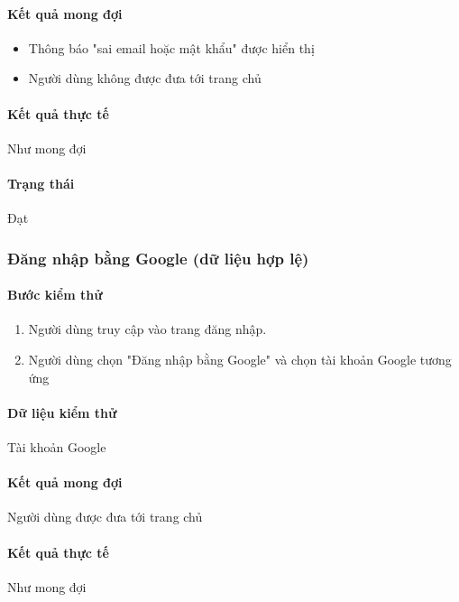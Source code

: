\documentclass[./../main.tex]{subfiles}
\begin{document}
\paragraph*{Kết quả mong đợi}

\begin{itemize}
    \item Thông báo "sai email hoặc mật khẩu" được hiển thị
    \item Người dùng không được đưa tới trang chủ
\end{itemize}

\paragraph*{Kết quả thực tế} Như mong đợi

\paragraph*{Trạng thái} Đạt

\subsubsection{Đăng nhập bằng Google (dữ liệu hợp lệ)}

\paragraph*{Bước kiểm thử}

\begin{enumerate}
    \item Người dùng truy cập vào trang đăng nhập.
    \item Người dùng chọn "Đăng nhập bằng Google" và chọn tài khoản Google tương ứng
\end{enumerate}

\paragraph*{Dữ liệu kiểm thử} Tài khoản Google

\paragraph*{Kết quả mong đợi} Người dùng được đưa tới trang chủ

\paragraph*{Kết quả thực tế} Như mong đợi
\end{document}

